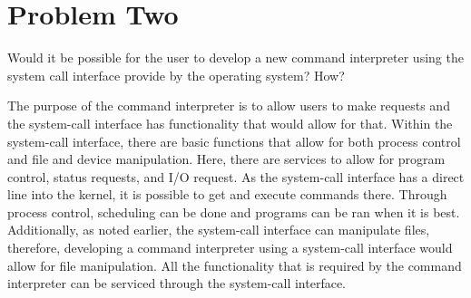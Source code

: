 \documentclass[letterpaper, 10pt,DIV=13]{scrartcl}
\numberwithin{equation}{section} %
\numberwithin{figure}{section} %
\numberwithin{table}{section} %
\begin{document}
\section{Problem Two}

Would	it	be	possible for	the	user	to	develop	a	new	command interpreter	using	the	system	call	interface	provide	by	the	operating	system?	How?

The purpose of the command interpreter is to allow users to make requests and the system-call interface has functionality that would allow for that. Within the system-call interface, there are basic functions that allow for both process control and file and device manipulation. Here, there are services to allow for program control, status requests, and I/O request. As the system-call interface has a direct line into the kernel, it is possible to get and execute commands there. Through process control, scheduling can be done and programs can be ran when it is best. Additionally, as noted earlier, the system-call interface can manipulate files, therefore, developing a command interpreter using a system-call interface would allow for file manipulation. All the functionality that is required by the command interpreter can be serviced through the system-call interface. 



\pagebreak
\end{document}
